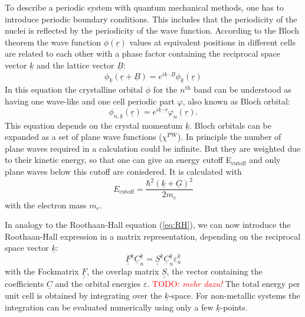 \documentclass[11pt,DIV=13,BCOR=5mm,a4paper,headinclude]{scrbook}
\newcommand\todo[1]{\textcolor{red}{TODO: \textit{{#1}}}}
\renewcommand{\vec}[1]{\underline{#1}}
\def\doubleunderline#1{\underline{\underline{#1}}}
\begin{document}
To describe a periodic system with quantum mechanical methods, one has to introduce periodic boundary conditions.
This includes that the periodicity of the nuclei is reflected by the periodicity of the wave function.
According to the Bloch theorem\cite{Bloch1928} the wave function $\phi(\vec{r})$ values at equivalent positions in different cells are related to each other with a phase factor containing the reciprocal space vector $\vec{k}$ and the lattice vector $\vec{B}$:
\begin{equation}
 \phi_{\vec{k}}(\vec{r} + \vec{B})=e^{i\vec{k}\cdot\vec{B}}\phi_{\vec{k}}(\vec{r})
\end{equation}
In this equation the crystalline orbital $\phi$ for the $n^\textrm{th}$ band can be understood as having one wave-like and one cell periodic part $\varphi$, also known as Bloch orbital:
\begin{equation}
 \phi_{n,\vec{k}}(\vec{r})=e^{i\vec{k}\cdot\vec{r}}\varphi_n(\vec{r}).
\end{equation}
This equation depends on the crystal momentum $\vec{k}$.
Bloch orbitals can be expanded as a set of plane wave functions ($\chi^\textrm{PW}$).
In principle the number of plane waves required in a calculation could be infinite.
But they are weighted due to their kinetic energy, so that one can give an energy cutoff E$_\textrm{cutoff}$ and only plane waves below this cutoff are conisdered.
It is calculated with
\begin{equation}
 E_\textrm{cutoff}=\frac{\hbar^2(\vec{k}+\vec{G})^2}{2m_e}
\end{equation}
with the electron mass $m_e$.


In analogy to the Roothaan-Hall equation (\ref{eq:RH}), we can now introduce the Roothaan-Hall expression in a matrix representation, depending on the reciprocal space vector $\vec{k}$:
 \begin{equation}
  \doubleunderline{F}^{\vec{k}}\vec{C}_n^{\vec{k}}=\doubleunderline{S}^{\vec{k}}\vec{C}_n^{\vec{k}}\varepsilon_n^{\vec{k}}
 \end{equation}
 with the Fockmatrix $\doubleunderline{F}$, the overlap matrix $\doubleunderline{S}$, the vector containing the coefficients $\vec{C}$ and the orbital energies $\varepsilon$.
\todo{mehr dazu!}
 The total energy per unit cell is obtained by integrating over the $\vec{k}$-space.
 For non-metallic systems the integration can be evaluated numerically using only a few $\vec{k}$-points\cite{monkhorst}.
\end{document}
